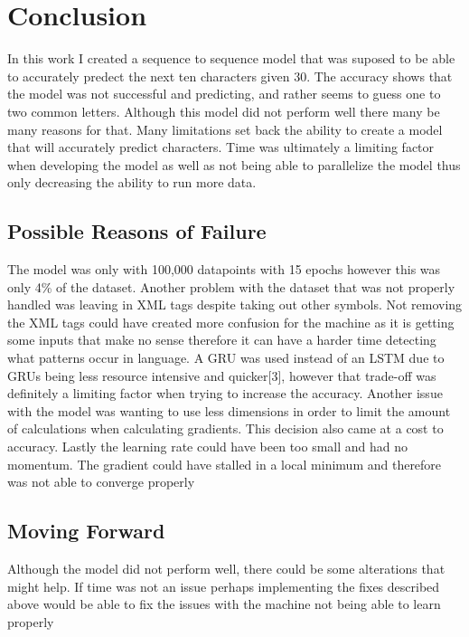 \documentclass[conference]{IEEEtran}
\begin{document}
\section{Conclusion}

In this work I created a sequence to sequence model that was suposed to be able to accurately predect the next ten characters given 30. The accuracy shows that the model was not successful and predicting, and rather seems to guess one to two common letters. Although this model did not perform well there many be many reasons for that. Many limitations set back the ability to create a model that will accurately predict characters. Time was ultimately a limiting factor when developing the model as well as not being able to parallelize the model thus only decreasing the ability to run more data. 
\subsection{Possible Reasons of Failure}
The model was only with 100,000 datapoints with 15 epochs however this was only 4\% of the dataset. Another problem with the dataset that was not properly handled was leaving in XML tags despite taking out other symbols. Not removing the XML tags could have created more confusion for the machine as it is getting some inputs that make no sense therefore it can have a harder time detecting what patterns occur in language. A GRU was used instead of an LSTM due to GRUs being less resource intensive and quicker[3], however that trade-off was definitely a limiting factor when trying to increase the accuracy. Another issue with the model was wanting to use less dimensions in order to limit the amount of calculations when calculating gradients. This decision also came at a cost to accuracy. Lastly the learning rate could have been too small and had no momentum. The gradient could have stalled in a local minimum and therefore was not able to converge properly
\subsection{Moving Forward}
Although the model did not perform well, there could be some alterations that might help. If time was not an issue perhaps implementing the fixes described above would be able to fix the issues with the machine not being able to learn properly
\end{document}
